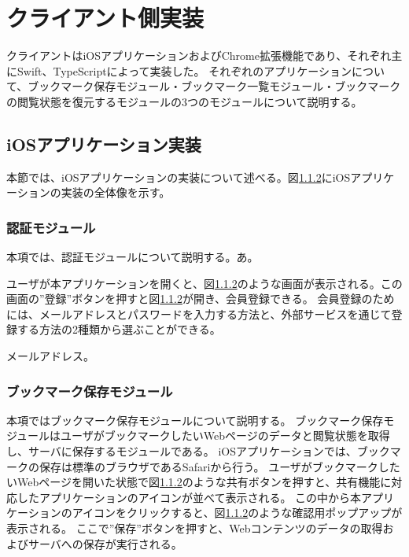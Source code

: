 \section{クライアント側実装}
クライアントはiOSアプリケーションおよびChrome拡張機能であり、それぞれ主にSwift、TypeScriptによって実装した。
それぞれのアプリケーションについて、ブックマーク保存モジュール・ブックマーク一覧モジュール・ブックマークの閲覧状態を復元するモジュールの3つのモジュールについて説明する。

\subsection{iOSアプリケーション実装}
本節では、iOSアプリケーションの実装について述べる。図\ref{}にiOSアプリケーションの実装の全体像を示す。

\subsubsection{認証モジュール}
本項では、認証モジュールについて説明する。あ。

ユーザが本アプリケーションを開くと、図\ref{}のような画面が表示される。この画面の”登録”ボタンを押すと図\ref{}が開き、会員登録できる。
会員登録のためには、メールアドレスとパスワードを入力する方法と、外部サービスを通じて登録する方法の2種類から選ぶことができる。

メールアドレス。





\subsubsection{ブックマーク保存モジュール}
本項ではブックマーク保存モジュールについて説明する。
ブックマーク保存モジュールはユーザがブックマークしたいWebページのデータと閲覧状態を取得し、サーバに保存するモジュールである。
iOSアプリケーションでは、ブックマークの保存は標準のブラウザであるSafariから行う。
ユーザがブックマークしたいWebページを開いた状態で図\ref{}のような共有ボタンを押すと、共有機能に対応したアプリケーションのアイコンが並べて表示される。
この中から本アプリケーションのアイコンをクリックすると、図\ref{}のような確認用ポップアップが表示される。
ここで”保存”ボタンを押すと、Webコンテンツのデータの取得およびサーバへの保存が実行される。

